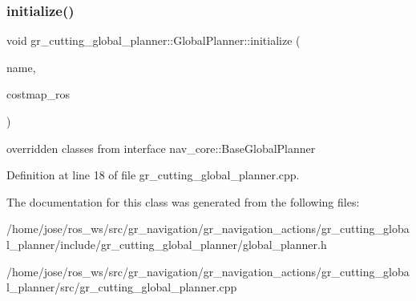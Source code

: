 \subsubsection{\texorpdfstring{initialize()}{initialize()}}
{\footnotesize\ttfamily void gr\+\_\+cutting\+\_\+global\+\_\+planner\+::\+Global\+Planner\+::initialize (\begin{DoxyParamCaption}\item[{std\+::string}]{name,  }\item[{costmap\+\_\+2d\+::\+Costmap2\+D\+R\+OS $\ast$}]{costmap\+\_\+ros }\end{DoxyParamCaption})}

overridden classes from interface nav\+\_\+core\+::\+Base\+Global\+Planner 

Definition at line 18 of file gr\+\_\+cutting\+\_\+global\+\_\+planner.\+cpp.



The documentation for this class was generated from the following files\+:\begin{DoxyCompactItemize}
\item 
/home/jose/ros\+\_\+ws/src/gr\+\_\+navigation/gr\+\_\+navigation\+\_\+actions/gr\+\_\+cutting\+\_\+global\+\_\+planner/include/gr\+\_\+cutting\+\_\+global\+\_\+planner/global\+\_\+planner.\+h\item 
/home/jose/ros\+\_\+ws/src/gr\+\_\+navigation/gr\+\_\+navigation\+\_\+actions/gr\+\_\+cutting\+\_\+global\+\_\+planner/src/gr\+\_\+cutting\+\_\+global\+\_\+planner.\+cpp\end{DoxyCompactItemize}
